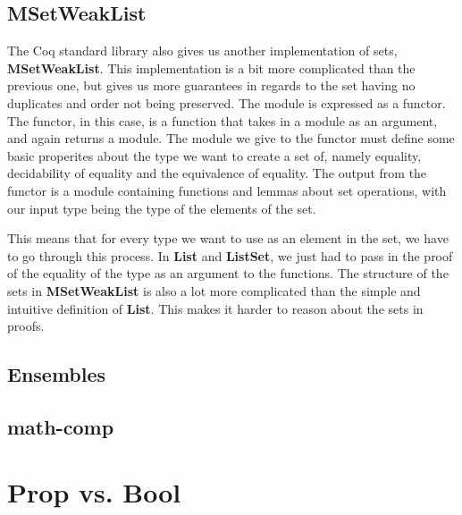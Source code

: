 \subsection{MSetWeakList}

The Coq standard library also gives us another implementation of sets, \textbf{MSetWeakList}.
This implementation is a bit more complicated than the previous one, but gives us more guarantees in regards to the set having no duplicates
and order not being preserved. The module is expressed as a functor.
The functor, in this case, is a function that takes in a module as an argument, and again returns a module.
The module we give to the functor must define some basic properites about the type we want to create a set of, namely equality,
decidability of equality and the equivalence of equality.
The output from the functor is a module containing functions and lemmas about set operations, with our input type being the type of the elements of the set.

This means that for every type we want to use as an element in the set, we have to go through this process.
In \textbf{List} and \textbf{ListSet}, we just had to pass in the proof of the equality of the type as an argument to the functions.
The structure of the sets in \textbf{MSetWeakList} is also a lot more complicated than the simple and intuitive definition of \textbf{List}.
This makes it harder to reason about the sets in proofs.


\subsection{Ensembles}

\subsection{math-comp}


\section{Prop vs. Bool}
